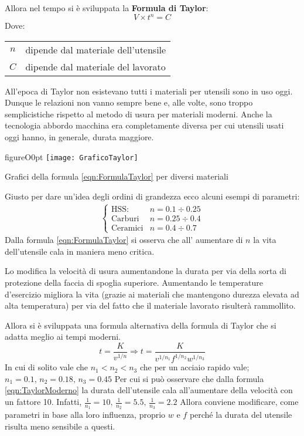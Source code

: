 Allora nel tempo si è sviluppata la \textbf{Formula di Taylor}:
\begin{equation}
V \times t^n = C \label{eqn:FormulaTaylor}
\end{equation}
Dove:\\
\begin{tabular}{cl}
$n$ & dipende dal materiale dell'utensile\\
$C$ & dipende dal materiale del lavorato
\end{tabular}
All'epoca di Taylor non esistevano tutti i materiali per utensili sono in uso oggi. Dunque le relazioni non vanno sempre bene e, alle volte, sono troppo semplicistiche rispetto al metodo di usura per materiali moderni.
Anche la tecnologia abbordo macchina era completamente diversa per cui utensili usati oggi hanno, in generale, durata maggiore.

\begin{wrapfloat}{figure}{O}{0pt}
\texttt{[image: GraficoTaylor]}
\caption{Grafici della formula \eqref{eqn:FormulaTaylor} per diversi materiali}
\label{fig:GraficoTaylor}
\end{wrapfloat}

Giusto per dare un'idea degli ordini di grandezza ecco alcuni esempi di parametri:
\begin{align}
\begin{cases}
\text{HSS: } &n = 0.1 \div 0.25\\
\text{Carburi} &n = 0.25 \div 0.4\\
\text{Ceramici} &n = 0.4 \div 0.7  
\end{cases}
\end{align}
Dalla formula \eqref{eqn:FormulaTaylor} si osserva che all' aumentare di $n$ la vita dell'utensile cala in maniera meno critica.

Lo  modifica la velocità di usura aumentandone la durata per via della sorta di protezione della faccia di spoglia superiore.
Aumentando le temperature d'esercizio migliora la vita (grazie ai materiali che mantengono durezza elevata ad alta temperatura) per via del fatto che il materiale lavorato risulterà rammollito.

Allora si è sviluppata una formula alternativa della formula di Taylor che si adatta meglio ai tempi moderni.
\begin{equation}
t = \frac{K}{v^{1/n}} \Rightarrow t = \frac{K}{v^{1/n_1} f^{1/n_2} w^{1/n_3}} \label{eqn:TaylorModerno}
\end{equation}
In cui di solito vale che $n_1 < n_2 < n_3$ che per un acciaio rapido vale;
$n_1 = 0.1, \, n_2 = 0.18, \, n_3 = 0.45$
Per cui si può osservare che dalla formula \eqref{eqn:TaylorModerno} la durata dell'utensile cala all'aumentare della velocità con un fattore 10.
Infatti, $\frac{1}{n_1} = 10, \, \frac{1}{n_2} = 5.5, \, \frac{1}{n_3} = 2.2$
Allora conviene modificare, come parametri in base alla loro influenza, proprio $w$ e $f$ perché la durata del utensile risulta meno sensibile a questi.

